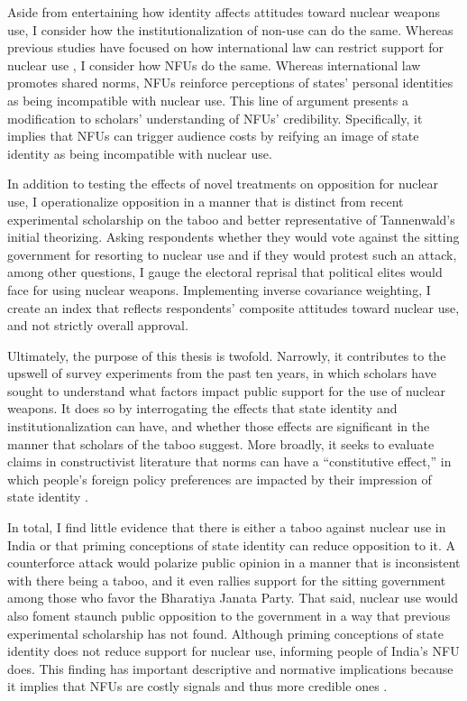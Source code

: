 \documentclass[12pt]{article}
\begin{document}
Aside from entertaining how identity affects attitudes toward nuclear weapons use, I consider how the institutionalization of non-use can do the same. Whereas previous studies have focused on how international law can restrict support for nuclear use \citep{carpenter_stopping_2020, sagan_atomic_2024}, I consider how NFUs do the same. Whereas international law promotes shared norms, NFUs reinforce perceptions of states' personal identities as being incompatible with nuclear use. This line of argument presents a modification to scholars' understanding of NFUs' credibility. Specifically, it implies that NFUs can trigger audience costs by reifying an image of state identity as being incompatible with nuclear use.

In addition to testing the effects of novel treatments on opposition for nuclear use, I operationalize opposition in a manner that is distinct from recent experimental scholarship on the taboo and better representative of Tannenwald's initial theorizing. Asking respondents whether they would vote against the sitting government for resorting to nuclear use and if they would protest such an attack, among other questions, I gauge the electoral reprisal that political elites would face for using nuclear weapons. Implementing inverse covariance weighting, I create an index that reflects respondents' composite attitudes toward nuclear use, and not strictly overall approval.

Ultimately, the purpose of this thesis is twofold. Narrowly, it contributes to the upswell of survey experiments from the past ten years, in which scholars have sought to understand what factors impact public support for the use of nuclear weapons. It does so by interrogating the effects that state identity and institutionalization can have, and whether those effects are significant in the manner that scholars of the taboo suggest. More broadly, it seeks to evaluate claims in constructivist literature that norms can have a “constitutive effect,” in which people's foreign policy preferences are impacted by their impression of state identity \citep{wendt_anarchy_1992}.

In total, I find little evidence that there is either a taboo against nuclear use in India or that priming conceptions of state identity can reduce opposition to it. A counterforce attack would polarize public opinion in a manner that is inconsistent with there being a taboo, and it even rallies support for the sitting government among those who favor the Bharatiya Janata Party. That said, nuclear use would also foment staunch public opposition to the government in a way that previous experimental scholarship has not found. Although priming conceptions of state identity does not reduce support for nuclear use, informing people of India's NFU does. This finding has important descriptive and normative implications because it implies that NFUs are costly signals and thus more credible ones \citep{fearon_domestic_1994}. 
\end{document}

